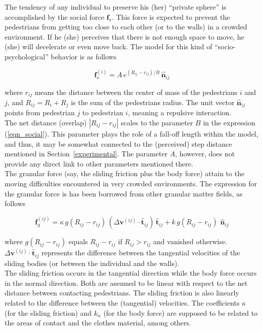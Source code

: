 \documentclass[preprint,12pt]{elsarticle}
\begin{document}
The tendency of any individual to preserve his (her) ``private sphere'' is 
accomplished by the social force $\mathbf{f}_s$. This force is expected to 
prevent the pedestrians from getting too close to each other (or to the walls) 
in a crowded environment. If he (she) perceives that there is not enough space 
to move, he (she) will decelerate or even move back. The model for this kind of 
``socio-psychological'' behavior is as follows

\begin{equation}
 \mathbf{f}_s^{(i)}=A\,e^{(R_{ij}-r_{ij})/B}\,\hat{\mathbf{n}}_{ij}
 \label{eqn_social}
\end{equation}

\noindent where $r_{ij}$ means the distance between the center of mass of the 
pedestrians $i$ and $j$, and $R_{ij}=R_i+R_j$ is the sum of the pedestrians 
radius. The unit vector $\hat{\mathbf{n}}_{ij}$ points from pedestrian $j$ to 
pedestrian $i$, meaning a repulsive interaction.\\ 

The net distance (overlap) $|R_{ij}-r_{ij}|$ scales to the parameter $B$ in the 
expression (\ref{eqn_social}). This parameter plays the role of a fall-off 
length within the model, and thus, it may be somewhat connected to the 
(perceived) step distance mentioned in Section~\ref{experimental}. The 
parameter $A$, however, does not provide any direct link to other parameters 
mentioned there. \\    

The granular force (say, the sliding friction plus the body force) attain to 
the moving difficulties encountered in very crowded environments. The 
expression for the granular force is has been borrowed from other granular 
matter fields, as follows

\begin{equation}
 \mathbf{f}_g^{(ij)}=\kappa\,g(R_{ij}-r_{ij})\,
(\Delta\mathbf{v}^{(ij)}\cdot\hat{\mathbf{t}}_{ij})\,\hat{\mathbf{t}}_{ij}+
k\,g(R_{ij}-r_{ij})\,
\,\hat{\mathbf{n}}_{ij}\label{eqn_friction}
\end{equation}

\noindent where $g(R_{ij}-r_{ij})$ equals $R_{ij}-r_{ij}$ if $R_{ij}>r_{ij}$ and 
vanished otherwise. $\Delta\mathbf{v}^{(ij)}\cdot\hat{\mathbf{t}}_{ij}$ 
represents the difference between the tangential velocities of the sliding 
bodies (or between the individual and the walls).    \\

The sliding friction occurs in the tangential direction while the body force 
occurs in the normal direction. Both are assumed to be linear with respect to 
the net distance between contacting pedestrians. The sliding friction is also 
linearly related to the difference between the (tangential) velocities. The 
coefficients $\kappa$ (for the sliding friction) and $k_n$ (for the 
body force) are supposed to be related to the areas of contact and the clothes 
material, among others. \\
\end{document}
